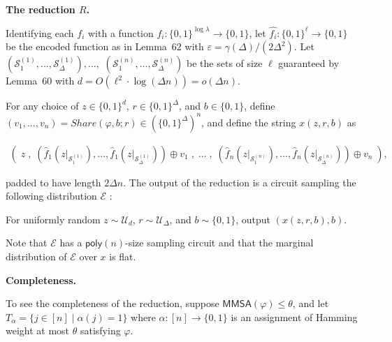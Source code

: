 \par\medskip\noindent\textbf{The reduction $R$.}\par




Identifying each $f_{i}$ with a function $f_{i}:\{0,1\}^{\log\lambda}\to\{0,1\}$, let $\hat{f_{i}}:\{0,1\}^{\ell}\to\{0,1\}$ be the encoded function as in Lemma 62 with $\varepsilon=\gamma(\Delta)/(2\Delta^{2})$. Let $\left(\mathcal{S}^{(1)}_{1},...,\mathcal{S}^{(1)}_{\Delta}\right),...,$ $\left(\mathcal{S}^{(n)}_{1},...,\mathcal{S}^{(n)}_{\Delta}\right)$ be the sets of size $\ell$ guaranteed by Lemma 60 with $d=O(\ell^{2}\cdot\log(\Delta n))=o(\Delta n)$.\par




For any choice of $z\in\{0,1\}^{d}$, $r\in\{0,1\}^{\Delta}$, and $b\in\{0,1\}$, define $(v_{1},...,v_{n})=Share(\varphi,b;r)\in(\{0,1\}^{\Delta})^{n}$, and define the string $x(z,r,b)$ as\par


\[\begin{gathered}
\left(\;z\;,\;\left(\hat{f}_{1}\left(z|_{\mathcal{S}^{(1)}_{1}}\right),...,\hat{f}_{1}\left(z|_{\mathcal{S}^{(1)}_{\Delta}}\right)\right)\oplus v_{1}\;,\;...\;,\;\left(\hat{f}_{n}\left(z|_{\mathcal{S}^{(n)}_{1}}\right),...,\hat{f}_{n}\left(z|_{\mathcal{S}^{(n)}_{\Delta}}\right)\right)\oplus v_{n}\;\right),
\end{gathered}\]


padded to have length $2\Delta n$. The output of the reduction is a circuit sampling the following distribution $\mathcal{E}$ :\par



For uniformly random $z\sim\mathcal{U}_{d}$, $r\sim\mathcal{U}_{\Delta}$, and $b\sim\{0,1\}$, output $(x(z,r,b),b)$.\par



Note that $\mathcal{E}$ has a ${\mathsf{poly}}(n)$-size sampling circuit and that the marginal distribution of $\mathcal{E}$ over $x$ is flat.\par





\par\medskip\noindent\textbf{Completeness.}\par




To see the completeness of the reduction, suppose ${\mathsf{MMSA}}(\varphi)\leq\theta$, and let $T_{\alpha}=\{j\in[n]\mid\alpha(j)=1\}$ where $\alpha:[n]\to\{0,1\}$ is an assignment of Hamming weight at most $\theta$ satisfying $\varphi$.\par




